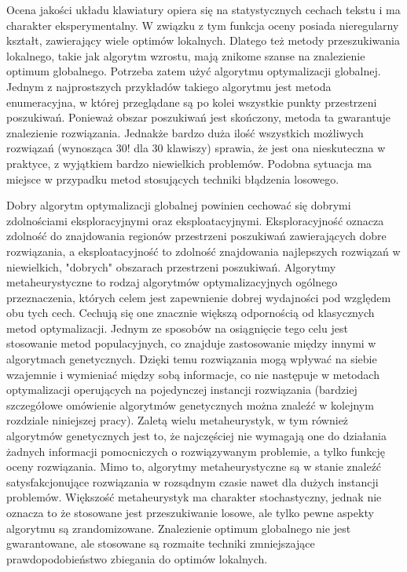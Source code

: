 \documentclass{xmgr}
\begin{document}
Ocena jakości układu klawiatury opiera się na statystycznych cechach tekstu i ma charakter eksperymentalny. W związku z tym funkcja oceny posiada nieregularny kształt, zawierający wiele optimów lokalnych. Dlatego też metody przeszukiwania lokalnego, takie jak algorytm wzrostu, mają znikome szanse na znalezienie optimum globalnego. Potrzeba zatem użyć algorytmu optymalizacji globalnej. Jednym z najprostszych przykładów takiego algorytmu jest metoda enumeracyjna, w której przeglądane są po kolei wszystkie punkty przestrzeni poszukiwań. Ponieważ obszar poszukiwań jest skończony, metoda ta gwarantuje znalezienie rozwiązania. Jednakże bardzo duża ilość wszystkich możliwych rozwiązań (wynosząca $30!$ dla 30 klawiszy) sprawia, że jest ona nieskuteczna w praktyce, z wyjątkiem bardzo niewielkich problemów. Podobna sytuacja ma miejsce w przypadku metod stosujących techniki błądzenia losowego.

Dobry algorytm optymalizacji globalnej powinien cechować się dobrymi zdolnościami eksploracyjnymi oraz eksploatacyjnymi. Eksploracyjność oznacza zdolność do znajdowania regionów przestrzeni poszukiwań zawierających dobre rozwiązania, a eksploatacyjność to zdolność znajdowania najlepszych rozwiązań w niewielkich, "dobrych" obszarach przestrzeni poszukiwań. Algorytmy metaheurystyczne to rodzaj algorytmów optymalizacyjnych ogólnego przeznaczenia, których celem jest zapewnienie dobrej wydajności pod względem obu tych cech. Cechują się one znacznie większą odpornością od klasycznych metod optymalizacji. Jednym ze sposobów na osiągnięcie tego celu jest stosowanie metod populacyjnych, co znajduje zastosowanie między innymi w algorytmach genetycznych. Dzięki temu rozwiązania mogą wpływać na siebie wzajemnie i wymieniać między sobą informacje, co nie następuje w metodach optymalizacji operujących na pojedynczej instancji rozwiązania (bardziej szczegółowe omówienie algorytmów genetycznych można znaleźć w kolejnym rozdziale niniejszej pracy). Zaletą wielu metaheurystyk, w tym również algorytmów genetycznych jest to, że najczęściej nie wymagają one do działania żadnych informacji pomocniczych o rozwiązywanym problemie, a tylko funkcję oceny rozwiązania. Mimo to, algorytmy metaheurystyczne są w stanie znaleźć satysfakcjonujące rozwiązania w rozsądnym czasie nawet dla dużych instancji problemów. Większość metaheurystyk ma charakter stochastyczny, jednak nie oznacza to że stosowane jest przeszukiwanie losowe, ale tylko pewne aspekty algorytmu są zrandomizowane. Znalezienie optimum globalnego nie jest gwarantowane, ale stosowane są rozmaite techniki zmniejszające prawdopodobieństwo zbiegania do optimów lokalnych.
\end{document}

